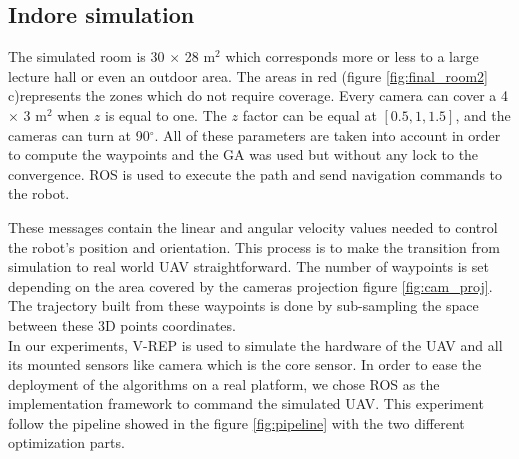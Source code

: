 
\subsection{Indore simulation} \label{experiment}
The simulated room is 30 $\times$ 28 m$^2$ which corresponds more or less to a large lecture hall or even an outdoor area. The areas in red (figure \ref{fig:final_room2} c)represents the zones which do not require coverage. Every camera can cover a 4 $\times$ 3 m$^2$  when $z$ is equal to one. The $z$ factor can be equal at $[0.5, 1, 1.5]$, and the cameras can turn  at 90$^{\circ}$. All of these parameters are taken into account in order to compute the waypoints and the GA was used but without any lock to the convergence. 
ROS is used to execute the path and send navigation commands to the robot.

These messages contain the linear and angular velocity values needed to control the robot's position and orientation. This process is to make the transition from simulation to real world UAV straightforward. The number of waypoints is set depending on the area covered by the cameras projection figure \ref{fig:cam_proj}. The trajectory built from these waypoints is done by sub-sampling the space between these 3D points coordinates.\\
In our experiments, V-REP \cite{Vrep} is used to simulate the hardware of the UAV and all its mounted sensors like camera which is the core sensor. 
In order to ease the deployment of the algorithms on a real platform, we chose ROS \cite{ROS} as the implementation framework to command the simulated UAV.
 This experiment follow the pipeline showed in the figure \ref{fig:pipeline} with the two different optimization parts.\\
 
%  
%  

